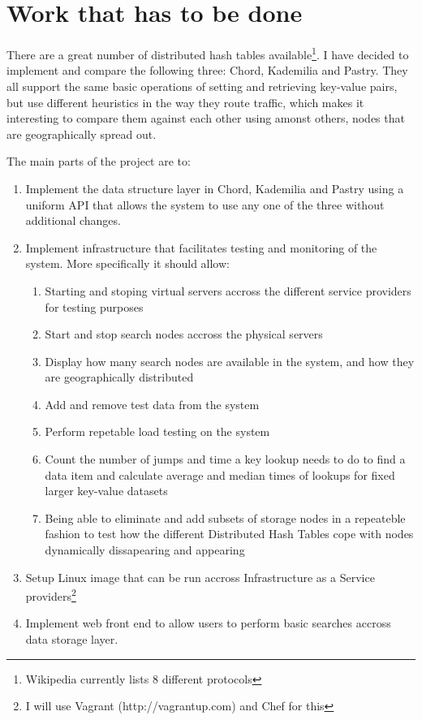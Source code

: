 \section*{Work that has to be done}

There are a great number of distributed hash tables available\footnote{Wikipedia currently lists 8 different protocols}. I have decided to implement and compare the following three: Chord, Kademilia and Pastry. They all support the same basic operations of setting and retrieving key-value pairs, but use different heuristics in the way they route traffic, which makes it interesting to compare them against each other using amonst others, nodes that are geographically spread out.

The main parts of the project are to:

\begin{enumerate}
  \item Implement the data structure layer in Chord, Kademilia and Pastry using a uniform API that allows the system to use any one of the three without additional changes.
  
  \item Implement infrastructure that facilitates testing and monitoring of the system. More specifically it should allow:

  \begin{enumerate}
    \item Starting and stoping virtual servers accross the different service providers for testing purposes
    \item Start and stop search nodes accross the physical servers
    \item Display how many search nodes are available in the system, and how they are geographically distributed
    \item Add and remove test data from the system
    \item Perform repetable load testing on the system
    \item Count the number of jumps and time a key lookup needs to do to find a data item and calculate average and median times of lookups for fixed larger key-value datasets
    \item Being able to eliminate and add subsets of storage nodes in a repeateble fashion to test how the different Distributed Hash Tables cope with nodes dynamically dissapearing and appearing
  \end{enumerate}

  \item Setup Linux image that can be run accross Infrastructure as a Service providers\footnote{I will use Vagrant (http://vagrantup.com) and Chef for this}

  \item Implement web front end to allow users to perform basic searches accross data storage layer.

\end{enumerate}


